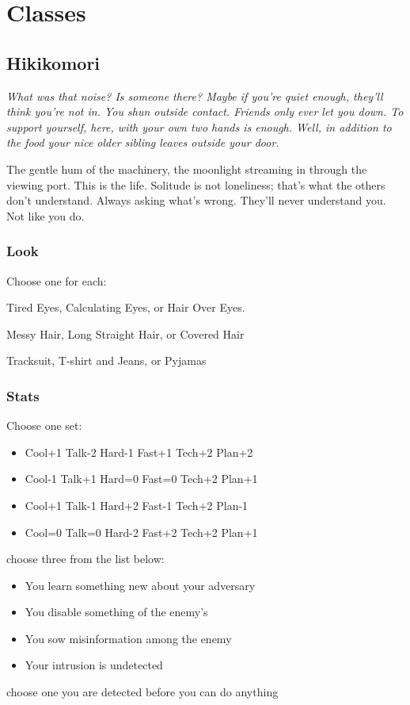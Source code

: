 \section{Classes}

\subsection{Hikikomori}
{\itshape What was that noise? Is someone there? Maybe if you're quiet enough, they'll think you're not in. You shun outside contact. Friends only ever let you down. To support yourself, here, with your own two hands is enough. Well, in addition to the food your nice older sibling leaves outside your door.

The gentle hum of the machinery, the moonlight streaming in through the viewing port. This is the life. Solitude is not loneliness; that's what the others don't understand. Always asking what's wrong. They'll never understand you. Not like you do.}

\subsubsection{Look}
Choose one for each:

Tired Eyes, Calculating Eyes, or Hair Over Eyes.

Messy Hair, Long Straight Hair, or Covered Hair

Tracksuit, T-shirt and Jeans, or Pyjamas

\subsubsection{Stats}
Choose one set:
\begin{itemize}
\setlength\itemsep{0em}
\item Cool+1 Talk-2 Hard-1 Fast+1 Tech+2 Plan+2
\item Cool-1 Talk+1 Hard=0 Fast=0 Tech+2 Plan+1
\item Cool+1 Talk-1 Hard+2 Fast-1 Tech+2 Plan-1
\item Cool=0 Talk=0 Hard-2 Fast+2 Tech+2 Plan+1
\end{itemize}

{choose three from the list below:
\begin{itemize}
\item You learn something new about your adversary
\item You disable something of the enemy's
\item You sow misinformation among the enemy
\item Your intrusion is undetected
\end{itemize}}
{choose one}
{you are detected before you can do anything}


